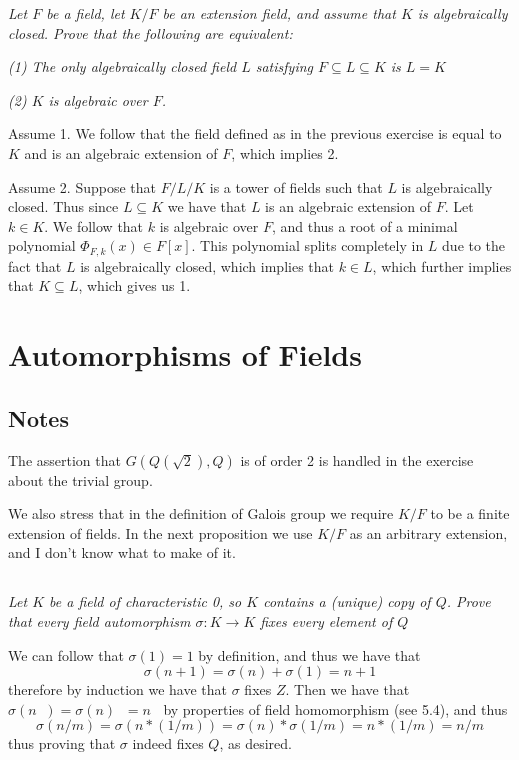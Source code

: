 \documentclass[11pt,oneside,titlepage]{book}
\DeclareMathOperator \inv {^{-1}}
\begin{document}
\textit{Let $F$ be a field, let $K/F$ be an extension field, and
assume that $K$ is algebraically closed. Prove that the following are
equivalent:}

\textit{(1) The only algebraically closed field $L$ satisfying $F
\subseteq L \subseteq K$ is $L = K$}

\textit{(2) $K$ is algebraic over $F$.}

Assume 1. We follow that the field defined as in the previous exercise
is equal to $K$ and is an algebraic extension of $F$, which implies 2.

Assume 2. Suppose that $F/L/K$ is a tower of fields such that $L$ is
algebraically closed. Thus since $L \subseteq K$ we have that $L$ is
an algebraic extension of $F$. Let $k \in K$. We follow that
$k$ is algebraic over $F$, and thus a root of a minimal polynomial
$\Phi_{F, k}(x) \in F[x]$. This polynomial splits completely in $L$
due to the fact that $L$ is algebraically closed, which implies that
$k \in L$, which further implies that $K \subseteq L$, which
gives us 1.

\section{Automorphisms of Fields}

\subsection*{Notes}

The assertion that $G(Q(\sqrt{2}), Q)$ is of order 2 is handled in the
exercise about the trivial group.

We also stress that in the definition of Galois group we require $K/F$
to be a finite extension of fields. In the next proposition
we use $K/F$ as an arbitrary extension, and I don't know what to make of
it. 

\subsection{}

\textit{Let $K$ be a field of characteristic 0, so $K$ contains a
  (unique) copy of $Q$.  Prove that every field automorphism $\sigma: K
  \to K$ fixes every element of $Q$}

We can follow that $\sigma(1) = 1$ by definition, and thus we have
that
$$\sigma(n + 1) = \sigma(n) + \sigma(1) = n + 1$$
therefore by induction we have that $\sigma$ fixes $Z$. Then we have
that $\sigma(n\inv) = \sigma(n)\inv = n\inv$ by properties of
field homomorphism (see 5.4), and thus
$$\sigma(n/m) = \sigma(n * (1/m)) = \sigma(n) * \sigma(1/ m) = n * (1/m) = n/m$$
thus proving that $\sigma$ indeed fixes $Q$, as desired.
\end{document}
